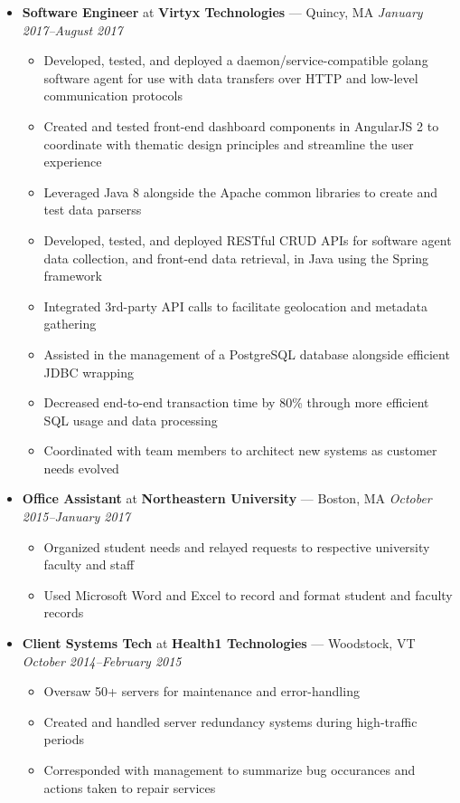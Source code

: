 \documentclass{article}
\begin{document}
\begin{itemize}[label={},leftmargin=*]
\item \textbf{Software Engineer} at \textbf{Virtyx Technologies} --- Quincy, MA \hfill {\em January 2017--August 2017}
  \begin{itemize}[label={$\bullet$}]
  \item Developed, tested, and deployed a daemon/service-compatible golang software agent for use with data transfers over HTTP and low-level communication protocols
  \item Created and tested front-end dashboard components in AngularJS 2 to coordinate with thematic design principles and streamline the user experience
  \item Leveraged Java 8 alongside the Apache common libraries to create and test data parserss
  \item Developed, tested, and deployed RESTful CRUD APIs for software agent data collection, and front-end data retrieval, in Java using the Spring framework
  \item Integrated 3rd-party API calls to facilitate geolocation and metadata gathering
  \item Assisted in the management of a PostgreSQL database alongside efficient JDBC wrapping
  \item Decreased end-to-end transaction time by 80\% through more efficient SQL usage and data processing
  \item Coordinated with team members to architect new systems as customer needs evolved
  \end{itemize}

\item \textbf{Office Assistant} at \textbf{Northeastern University} --- Boston, MA \hfill {\em October 2015--January 2017}
  \begin{itemize}[label={$\bullet$}]
  \item Organized student needs and relayed requests to respective university faculty and staff
  \item Used Microsoft Word and Excel to record and format student and faculty records
  \end{itemize}

\item \textbf{Client Systems Tech} at \textbf{Health1 Technologies} --- Woodstock, VT \hfill {\em October 2014--February 2015}
  \begin{itemize}[label={$\bullet$}]
  \item Oversaw 50+ servers for maintenance and error-handling
  \item Created and handled server redundancy systems during high-traffic periods
  \item Corresponded with management to summarize bug occurances and actions taken to repair services
  \end{itemize}
\end{itemize}
\end{document}
